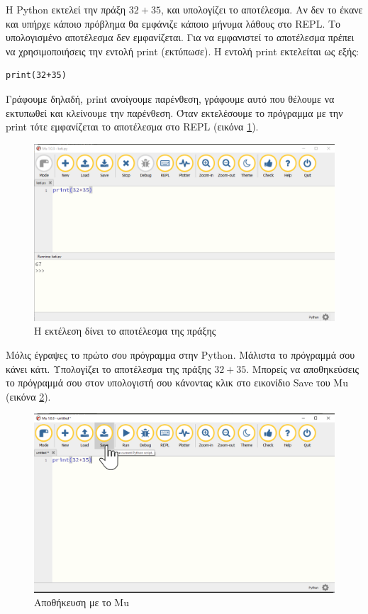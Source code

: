 \documentclass[b5paper,11pt,twoside,openleft]{memoir}
\begin{document}
Η Python εκτελεί την πράξη $32+35$, και υπολογίζει το αποτέλεσμα. Αν δεν το έκανε και υπήρχε κάποιο πρόβλημα θα εμφάνιζε κάποιο μήνυμα λάθους στο REPL. Το υπολογισμένο αποτέλεσμα δεν εμφανίζεται. Για να εμφανιστεί το αποτέλεσμα πρέπει να χρησιμοποιήσεις την εντολή print (εκτύπωσε). Η εντολή print εκτελείται ως εξής:
\begin{lstlisting}
print(32+35)
\end{lstlisting}
Γράφουμε δηλαδή, print ανοίγουμε παρένθεση, γράφουμε αυτό που θέλουμε να εκτυπωθεί και κλείνουμε την παρένθεση. Όταν εκτελέσουμε το πρόγραμμα με την print τότε εμφανίζεται το αποτέλεσμα στο REPL (εικόνα \ref{withprint}).
\begin{figure}
\includegraphics[width=\textwidth]{withprint.png}
\caption{Η εκτέλεση δίνει το αποτέλεσμα της πράξης}
\label{withprint}
\end{figure}
Μόλις έγραψες το πρώτο σου πρόγραμμα στην Python. Μάλιστα το πρόγραμμά σου κάνει κάτι. Υπολογίζει το αποτέλεσμα της πράξης $32+35$.
Μπορείς να αποθηκεύσεις το πρόγραμμά σου στον υπολογιστή σου κάνοντας κλικ στο εικονίδιο Save του Mu (εικόνα \ref{savewithmu}).
\begin{figure}
\includegraphics[width=\textwidth]{save.png}
\caption{Αποθήκευση με το Mu}
\label{savewithmu}
\end{figure}
\end{document}
